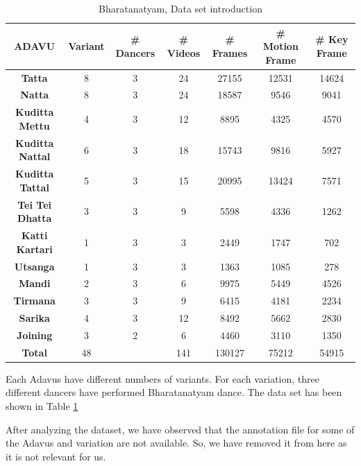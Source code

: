 \begin{table}[]
\hspace{-3cm}
\begin{tabular}{|c|c|c|c|c|c|c|}
\hline
\textbf{ADAVU} & \textbf{Variant} & \textbf{\# Dancers} & \textbf{\# Videos} & \textbf{\# Frames} & \textbf{\# Motion Frame} & \textbf{\# Key Frame} \\ \hline
\textbf{Tatta}          & 8  & 3 & 24  & 27155  & 12531 & 14624 \\ \hline
\textbf{Natta}          & 8  & 3 & 24  & 18587  & 9546  & 9041  \\ \hline
\textbf{Kuditta Mettu}  & 4  & 3 & 12  & 8895   & 4325  & 4570  \\ \hline
\textbf{Kuditta Nattal} & 6  & 3 & 18  & 15743  & 9816  & 5927  \\ \hline
\textbf{Kuditta Tattal} & 5  & 3 & 15  & 20995  & 13424 & 7571  \\ \hline
\textbf{Tei Tei Dhatta} & 3  & 3 & 9   & 5598   & 4336  & 1262  \\ \hline
\textbf{Katti Kartari}  & 1  & 3 & 3   & 2449   & 1747  & 702   \\ \hline
\textbf{Utsanga}        & 1  & 3 & 3   & 1363   & 1085  & 278   \\ \hline
\textbf{Mandi}          & 2  & 3 & 6   & 9975   & 5449  & 4526  \\ \hline
\textbf{Tirmana}        & 3  & 3 & 9   & 6415   & 4181  & 2234  \\ \hline
\textbf{Sarika}         & 4  & 3 & 12  & 8492   & 5662  & 2830  \\ \hline
\textbf{Joining}        & 3  & 2 & 6   & 4460   & 3110  & 1350  \\ \hline
\textbf{Total}          & 48 &   & 141 & 130127 & 75212 & 54915 \\ \hline
\end{tabular}
\caption{Bharatanatyam, Data set introduction}
\label{tab:Ch01T01}
\end{table}

Each Adavus have different numbers of variants. For each variation, three different dancers have performed Bharatanatyam dance. The data set has been shown in Table \ref{tab:Ch01T01}

After analyzing the dataset, we have observed that the annotation file for some of the Adavus and variation are not available. So, we have removed it from here as it is not relevant for us.

